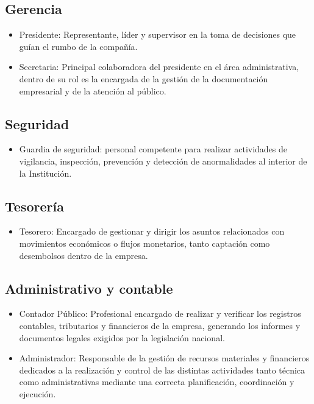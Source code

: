 \subsection {Gerencia}
\begin{itemize}
	\item Presidente: Representante, líder y supervisor en la toma de decisiones que guían el rumbo de la compañía. \\
	\item Secretaria: Principal colaboradora del presidente en el área administrativa, dentro de su rol es la encargada de la gestión de la documentación empresarial y de la atención al público.\\
\end{itemize}

\subsection{Seguridad} 
\begin{itemize}
	\item Guardia de seguridad: personal competente para realizar  actividades  de  vigilancia,  inspección,  prevención  y  detección  de  anormalidades  al interior de la Institución.
\end{itemize}

\subsection{Tesorería} 
\begin{itemize}
	\item Tesorero: Encargado de gestionar y dirigir los asuntos relacionados con movimientos económicos o flujos monetarios, tanto captación como desembolsos dentro de la empresa.
\end{itemize}

\subsection{Administrativo y contable} 
\begin{itemize}
	\item Contador Público: Profesional encargado de realizar y verificar los registros contables, tributarios y financieros de la empresa, generando los informes y documentos legales exigidos por la legislación nacional.
	\item Administrador: Responsable de la gestión de recursos materiales y financieros dedicados a la realización y control de las distintas actividades tanto técnica como administrativas mediante una correcta planificación, coordinación y ejecución.
\end{itemize}

